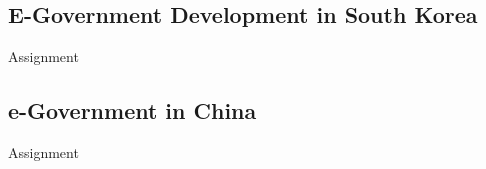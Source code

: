 \subsection{E-Government Development in South Korea}
Assignment

\subsection{e-Government in China}
Assignment

%
%
%
%


